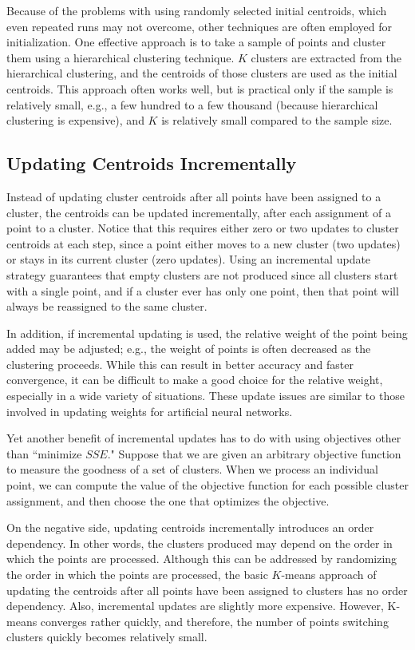 Because of the problems with using randomly selected initial centroids,
which even repeated runs may not overcome, other techniques are often employed
for initialization.  One effective approach is to take a sample of points
and cluster them using a hierarchical clustering technique. $K$ clusters are extracted
from the hierarchical clustering, and the centroids of those clusters are
used as the initial centroids. This approach often works well, but is practical
only if the sample is relatively small, e.g., a few hundred to a few thousand
(because hierarchical clustering is expensive), and $K$ is relatively small compared
to the sample size.

\subsection{Updating Centroids Incrementally}
Instead of updating cluster centroids after all points have been assigned to a
cluster, the centroids can be updated incrementally, after each assignment of
a point to a cluster.  Notice that this requires either zero or two updates to
cluster centroids at each step, since a point either moves to a new cluster (two
updates) or stays in its current cluster (zero updates).  Using an incremental
update strategy guarantees that empty clusters are not produced since all
clusters start with a single point, and if a cluster ever has only one point, then
that point will always be reassigned to the same cluster.

In addition, if incremental updating is used, the relative weight of the point
being added may be adjusted; e.g., the weight of points is often decreased as
the clustering proceeds.  While this can result in better accuracy and faster
convergence, it can be difficult to make a good choice for the relative weight,
especially in a wide variety of situations.  These update issues are similar to
those involved in updating weights for artificial neural networks.

Yet another benefit of incremental updates has to do with using objectives
other than ``minimize $SSE$." Suppose that we are given an arbitrary objective
function to measure the goodness of a set of clusters.  When we process an
individual point, we can compute the value of the objective function for each
possible cluster assignment, and then choose the one that optimizes the objective.

On the negative side, updating centroids incrementally introduces an order dependency.
In other words, the clusters produced may depend on the
order in which the points are processed.  Although this can be addressed by
randomizing the order in which the points are processed, the basic $K$-means
approach of updating the centroids after all points have been assigned to clusters
has no order dependency.  Also, incremental updates are slightly more
expensive.   However,  K-means converges rather quickly,  and therefore,  the
number of points switching clusters quickly becomes relatively small.

\endinput
